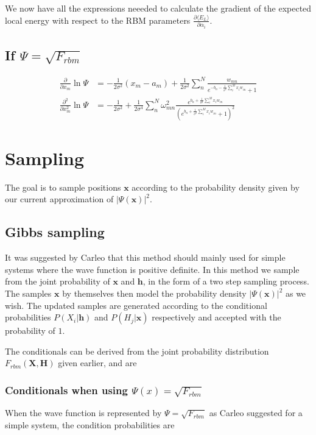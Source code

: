 \documentclass[norsk,a4paper,11pt]{article}
\newcommand{\VX}{\mathbf{X}}
\newcommand{\Vx}{\mathbf{x}}
\newcommand{\VH}{\mathbf{H}}
\newcommand{\Vh}{\mathbf{h}}
\begin{document}
We now have all the expressions neeeded to calculate the gradient of the expected local energy with respect to the RBM parameters $\frac{\partial \langle E_L \rangle}{\partial \alpha_i}$.

\subsection{If $\Psi = \sqrt{F_{rbm}}$}
\begin{align}
	\frac{\partial}{\partial x_m} \ln\Psi
	&= - \frac{1}{2\sigma^2}(x_m - a_m) + \frac{1}{2\sigma^2} \sum_n^N
 	\frac{w_{mn}}{e^{-b_n-\frac{1}{\sigma^2}\sum_i^M x_i w_{in}} + 1}
	\\
	\frac{\partial^2}{\partial x_m^2} \ln\Psi
	&= - \frac{1}{2\sigma^2} + \frac{1}{2\sigma^4}\sum_n^N \omega_{mn}^2 \frac{e^{b_n + \frac{1}{\sigma^2}\sum_i^M x_i w_{in}}}{(e^{b_n + \frac{1}{\sigma^2}\sum_i^M x_i w_{in}} + 1)^2}
\end{align}


\section{Sampling}
The goal is to sample positions $\Vx$ according to the probability density given by our current approximation of $|\Psi(\Vx)|^2$. 

\subsection{Gibbs sampling}
It was suggested by Carleo that this method should mainly used for simple systems where the wave function is positive definite.
In this method we sample from the joint probability of $\Vx$ and $\Vh$, in the form of a two step sampling process. The samples $\Vx$ by themselves then model the probability density $|\Psi(\Vx)|^2$ as we wish.
The updated samples are generated according to the conditional probabilities $P(X_i|\Vh)$ and $P(H_j|\Vx)$ respectively and accepted with the probability of $1$. 

The conditionals can be derived from the joint probability distribution $F_{rbm}(\VX, \VH)$ given earlier, and are



\subsubsection{Conditionals when using $\Psi(x) = \sqrt{F_{rbm}}$}
When the wave function is represented by $\Psi = \sqrt{F_{rbm}}$ as Carleo suggested for a simple system, the condition probabilities are
\end{document}
